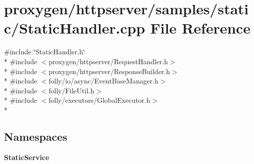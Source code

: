 \section{proxygen/httpserver/samples/static/\+Static\+Handler.cpp File Reference}
\label{StaticHandler_8cpp}
{\ttfamily \#include \char`\"{}Static\+Handler.\+h\char`\"{}}\\*
{\ttfamily \#include $<$proxygen/httpserver/\+Request\+Handler.\+h$>$}\\*
{\ttfamily \#include $<$proxygen/httpserver/\+Response\+Builder.\+h$>$}\\*
{\ttfamily \#include $<$folly/io/async/\+Event\+Base\+Manager.\+h$>$}\\*
{\ttfamily \#include $<$folly/\+File\+Util.\+h$>$}\\*
{\ttfamily \#include $<$folly/executors/\+Global\+Executor.\+h$>$}\\*
\subsection*{Namespaces}
\begin{DoxyCompactItemize}
\item 
 {\bf Static\+Service}
\end{DoxyCompactItemize}
